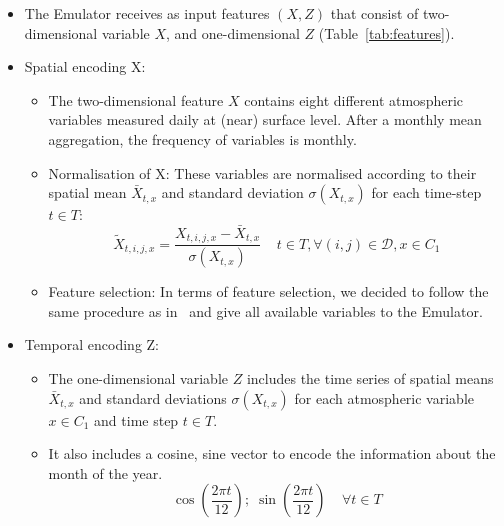 \documentclass[a4paper,11pt,oneside]{report}
\begin{document}
\begin{itemize}
    \item The Emulator receives as input features $(X, Z)$ that consist of two-dimensional variable $X$, and one-dimensional $Z$ (Table~\ref{tab:features}). 
    \item Spatial encoding X:
    \begin{itemize}
        \item The two-dimensional feature $X$ contains eight different atmospheric variables measured daily at (near) surface level. After a monthly mean aggregation, the frequency of variables is monthly.
         \item Normalisation of X: These variables are normalised according to their spatial mean $\bar{X}_{t,x}$ and standard deviation $\sigma(X_{t,x})$ for each time-step $t\in T$:
            \begin{equation}\label{eq:normalisation-X}
            \tilde{X}_{t,i,j,x} = \frac{X_{t,i,j,x}-\bar{X}_{t,x}}{\sigma(X_{t,x})} \;\;\;\; t\in T, \forall (i,j) \in \mathcal{D}, x\in C_1
        \end{equation}
        \item Feature selection: In terms of feature selection, we decided to follow the same procedure as in~\cite{Doury} and give all available variables to the Emulator. 

    \end{itemize}
\item Temporal encoding Z: \begin{itemize}
    \item 
The one-dimensional variable $Z$ includes the time series of spatial means $\bar{X}_{t,x}$ and standard deviations $\sigma(X_{t,x})$ for each atmospheric variable $x\in C_1$ and time step $t\in T$.

\item It also includes a cosine, sine vector to encode the information about the month of the year.
    \begin{equation*}
       \operatorname{cos}\left(\frac{2\pi t}{12}\right);\; \operatorname{sin}\left(\frac{2\pi t}{12}\right) \;\;\;\; \forall t\in T
    \end{equation*}
    

\end{itemize}
\end{itemize}
\end{document}
